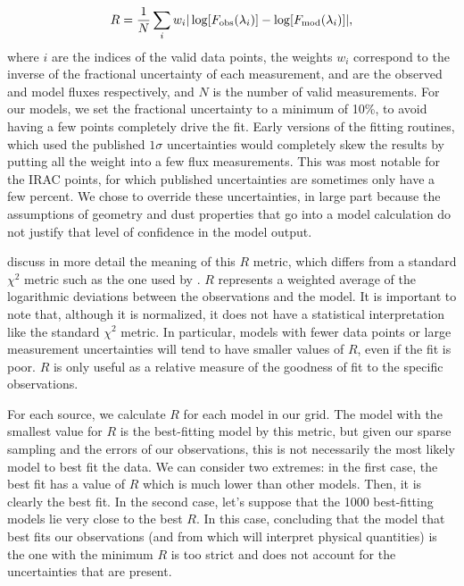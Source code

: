 \begin{equation}
R = \frac{1}{N}\sum_i w_i|\log[F_\textrm{obs}(\lambda_i)] - \log[F_\textrm{mod}(\lambda_i)]|,
\end{equation}
where $i$ are the indices of the valid data points, the weights $w_i$ correspond to the inverse of the fractional uncertainty of each measurement, \Fobs and \Fmod are the observed and model fluxes respectively, and $N$ is the number of valid measurements. For our models, we set the fractional uncertainty to a minimum of 10\%, to avoid having a few points completely drive the fit. Early versions of the fitting routines, which used the published $1\sigma$ uncertainties would completely skew the results by putting all the weight into a few flux measurements. This was most notable for the \Spitzer IRAC points, for which published uncertainties are sometimes only have a few percent. We chose to override these uncertainties, in large part because the assumptions of geometry and dust properties that go into a model calculation do not justify that level of confidence in the model output.

\citet{Furlan:2016df} discuss in more detail the meaning of this $R$ metric, which differs from a standard $\chi^2$ metric such as the one used by \citet{Robitaille:2007dl}. $R$ represents a weighted average of the logarithmic deviations between the observations and the model. It is important to note that, although it is normalized, it does not have a statistical interpretation like the standard $\chi^2$ metric. In particular, models with fewer data points or large measurement uncertainties will tend to have smaller values of $R$, even if the fit is poor. $R$ is only useful as a relative measure of the goodness of fit to the specific observations.

For each source, we calculate $R$ for each model in our grid. The model with the smallest value for $R$ is the best-fitting model by this metric, but given our sparse sampling and the errors of our observations, this is not necessarily the most likely model to best fit the data. We can consider two extremes: in the first case, the best fit has a value of $R$ which is much lower than other models. Then, it is clearly the best fit. In the second case, let's suppose that the \num{1000} best-fitting models lie very close to the best $R$. In this case, concluding that the model that best fits our observations (and from which will interpret physical quantities) is the one with the minimum $R$ is too strict and does not account for the uncertainties that are present. 

